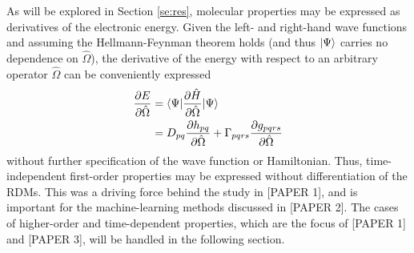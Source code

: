As will be explored in Section \ref{se:res}, molecular properties may be expressed as derivatives of the electronic energy. Given the left- and right-hand wave functions and assuming the Hellmann-Feynman theorem holds (and thus $| \Psi \rangle$ carries no dependence on $\hat{\Omega}$), the derivative of the energy with respect to an arbitrary operator $\hat\Omega$ can be conveniently expressed
\begin{equation} \label{eq:dE}
    \begin{aligned}
    \frac{\partial E}{\partial \hat\Omega} &= \langle\Psi |\frac{\partial \hat{H}}{\partial \hat\Omega}| \Psi \rangle\\
                                  &= D_{pq}\frac{\partial h_{pq}}{\partial \hat\Omega} + \Gamma_{pqrs}\frac{\partial g_{pqrs}}{\partial \hat\Omega}
    \end{aligned}
\end{equation}
without further specification of the wave function or Hamiltonian. Thus, time-independent first-order properties may be expressed without differentiation of the RDMs. This was a driving force behind the study in 
[PAPER 1], and is important for the machine-learning methods discussed in [PAPER 2]. The cases of 
higher-order and time-dependent properties, which are the
focus of [PAPER 1] and [PAPER 3], will be handled in the following section. 
